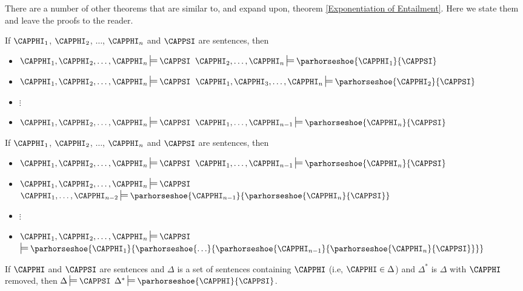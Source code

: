 There are a number of other theorems that are similar to, and expand upon, theorem \ref{Exponentiation of Entailment}. Here we state them and leave the proofs to the reader.
\begin{THEOREM}
{}
\begin{cenumerate}
\item If $\CAPPHI_1$, $\CAPPHI_2$, $\ldots$, $\CAPPHI_{\integer{n}}$ and $\CAPPSI$ are \GSL{} sentences, then
\begin{itemize}
\item[] $\CAPPHI_1,\CAPPHI_2,\ldots,\CAPPHI_{\integer{n}}\sdtstile{}{}\CAPPSI$ \Iff $\CAPPHI_2,\ldots,\CAPPHI_{\integer{n}}\sdtstile{}{}\parhorseshoe{\CAPPHI_1}{\CAPPSI}$
\item[] $\CAPPHI_1,\CAPPHI_2,\ldots,\CAPPHI_{\integer{n}}\sdtstile{}{}\CAPPSI$ \Iff $\CAPPHI_1,\CAPPHI_3,\ldots,\CAPPHI_{\integer{n}}\sdtstile{}{}\parhorseshoe{\CAPPHI_2}{\CAPPSI}$
\item[] \hspace{1in} $\vdots$
\item[] $\CAPPHI_1,\CAPPHI_2,\ldots,\CAPPHI_{n}\sdtstile{}{}\CAPPSI$ \Iff $\CAPPHI_1,\ldots,\CAPPHI_{n-1}\sdtstile{}{}\parhorseshoe{\CAPPHI_{\integer{n}}}{\CAPPSI}$
\end{itemize} 
\item If $\CAPPHI_1$, $\CAPPHI_2$, $\ldots$, $\CAPPHI_{\integer{n}}$ and $\CAPPSI$ are \GSL{} sentences, then
\begin{itemize}
\item[] $\CAPPHI_1,\CAPPHI_2,\ldots,\CAPPHI_{\integer{n}}\sdtstile{}{}\CAPPSI$ \Iff $\CAPPHI_1,\ldots,\CAPPHI_{n-1}\sdtstile{}{}\parhorseshoe{\CAPPHI_{\integer{n}}}{\CAPPSI}$
\item[] $\CAPPHI_1,\CAPPHI_2,\ldots,\CAPPHI_{\integer{n}}\sdtstile{}{}\CAPPSI$ \Iff $\CAPPHI_1,\ldots,\CAPPHI_{n-2}\sdtstile{}{}\parhorseshoe{\CAPPHI_{n-1}}{\parhorseshoe{\CAPPHI_{\integer{n}}}{\CAPPSI}}$
\item[] \hspace{1in} $\vdots$
\item[] $\CAPPHI_1,\CAPPHI_2,\ldots,\CAPPHI_{n}\sdtstile{}{}\CAPPSI$ \Iff $\sdtstile{}{}\parhorseshoe{\CAPPHI_1}{\parhorseshoe{\ldots}{\parhorseshoe{\CAPPHI_{n-1}}{\parhorseshoe{\CAPPHI_{\integer{n}}}{\CAPPSI}}}}$
\end{itemize}
\item If $\CAPPHI$ and $\CAPPSI$ are \GSL{} sentences and $\Delta$ is a set of \GSL{} sentences containing $\CAPPHI$ (i.e, $\CAPPHI\in\Delta$) and $\Delta^*$ is $\Delta$ with $\CAPPHI$ removed, then $\Delta\sdtstile{}{}\CAPPSI$ \Iff $\Delta^*\sdtstile{}{}\parhorseshoe{\CAPPHI}{\CAPPSI}$.

\end{cenumerate}
\end{THEOREM}
